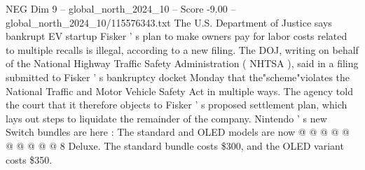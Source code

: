 \begin{textsample}{NEG Dim 9 – global\_north\_2024\_10 – Score -9.00 – global\_north\_2024\_10/115576343.txt}
The U.S.
Department of Justice says bankrupt EV startup Fisker ' s plan to make owners pay for labor costs related to multiple recalls is illegal, according to a new filing.
The DOJ, writing on behalf of the National Highway Traffic Safety Administration ( NHTSA ), said in a filing submitted to Fisker ' s bankruptcy docket Monday that the"scheme"violates the National Traffic and Motor Vehicle Safety Act in multiple ways.
The agency told the court that it therefore objects to Fisker ' s proposed settlement plan, which lays out steps to liquidate the remainder of the company.
Nintendo ' s new Switch bundles are here : The standard and OLED models are now @ @ @ @ @ @ @ @ @ @ 8 Deluxe.
The standard bundle costs \$300, and the OLED variant costs \$350.

\end{textsample}
